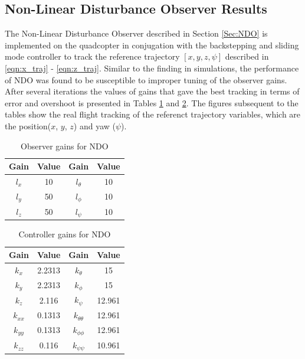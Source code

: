 \documentclass[letterpaper%
, twoside%
, 12pt%
,memoire%
, english%
,creativecommons,hyperref%
]{thETS}
\begin{document}
\subsection{Non-Linear Disturbance Observer Results}
The Non-Linear Disturbance Observer described in Section \ref{Sec:NDO} is implemented on the quadcopter in conjugation with the backstepping and sliding mode controller to track the reference trajectory $[x,y,z,\psi]$ described in \eqref{eqn:x_traj} - \eqref{eqn:z_traj}. Similar to the finding in simulations, the performance of NDO was found to be susceptible to improper tuning of the observer gains. After several iterations the values of gains that gave the best tracking in terms of error and overshoot is presented in Tables \ref{Tab:realNDOGains} and \ref{Tab:realControllerGains}. The figures subsequent to the tables show the real flight tracking of the referenct trajectory variables, which are the position($x$, $y$, $z$) and yaw ($\psi$). 
\begin{table}
\parbox{0.65\textwidth}{\caption{Observer gains for NDO}\label{Tab:realNDOGains}}
\begin{tabular}{|c|c|c|c|}
\hline
{\bf Gain}&{\bf Value}&{\bf Gain}&{\bf Value}\\ \hline
$l_x$ & 10 & $l_\theta$  & 10  \\ \hline
$l_y$ & 50 & $l_\phi$    & 10  \\ \hline
$l_z$ & 50 & $l_\psi$    & 10  \\ \hline 
\end{tabular}
\end{table}

\begin{table}
\parbox{0.65\textwidth}{\caption{Controller gains for NDO}\label{Tab:realControllerGains}} 
\begin{tabular}{|c|c|c|c|}
\hline
{\bf Gain} & {\bf Value} & {\bf Gain}         & {\bf Value}  \\ \hline
$k_x$      & 2.2313      & $k_\theta$         & 15           \\ \hline
$k_y$      & 2.2313      & $k_\phi$           & 15           \\ \hline
$k_z$      & 2.116       & $k_\psi$           & 12.961       \\ \hline 
$k_{xx}$   & 0.1313      & $k_{\theta\theta}$ & 12.961       \\ \hline
$k_{yy}$   & 0.1313      & $k_{\phi\phi}$     & 12.961       \\ \hline
$k_{zz}$   & 0.116       & $k_{\psi\psi}$     & 10.961       \\ \hline 
\end{tabular}
\end{table}
\end{document}
